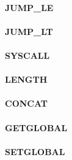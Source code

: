 \documentclass[12pt,a4paper]{article}
\begin{document}
\vspace{2em}\begin{minipage}{\textwidth}
\paragraph{JUMP\_LE}
\end{minipage}

\vspace{2em}\begin{minipage}{\textwidth}
\paragraph{JUMP\_LT}
\end{minipage}

\vspace{2em}\begin{minipage}{\textwidth}
\paragraph{SYSCALL}
\end{minipage}

\vspace{2em}\begin{minipage}{\textwidth}
\paragraph{LENGTH}
\end{minipage}

\vspace{2em}\begin{minipage}{\textwidth}
\paragraph{CONCAT}
\end{minipage}

\vspace{2em}\begin{minipage}{\textwidth}
\paragraph{GETGLOBAL}
\end{minipage}

\vspace{2em}\begin{minipage}{\textwidth}
\paragraph{SETGLOBAL}
\end{minipage}
\end{document}

